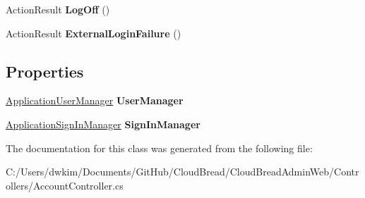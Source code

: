 \begin{DoxyCompactItemize}
\item 
Action\+Result {\bfseries Log\+Off} ()\hypertarget{class_cloud_bread_admin_web_1_1_controllers_1_1_account_controller_a5fd1abcf376de86b70209e770cbb5bca}{}\label{class_cloud_bread_admin_web_1_1_controllers_1_1_account_controller_a5fd1abcf376de86b70209e770cbb5bca}

\item 
Action\+Result {\bfseries External\+Login\+Failure} ()\hypertarget{class_cloud_bread_admin_web_1_1_controllers_1_1_account_controller_a4553fc1091db8e6a23cf05a80beca438}{}\label{class_cloud_bread_admin_web_1_1_controllers_1_1_account_controller_a4553fc1091db8e6a23cf05a80beca438}

\end{DoxyCompactItemize}
\subsection*{Properties}
\begin{DoxyCompactItemize}
\item 
\hyperlink{class_cloud_bread_admin_web_1_1_application_user_manager}{Application\+User\+Manager} {\bfseries User\+Manager}\hypertarget{class_cloud_bread_admin_web_1_1_controllers_1_1_account_controller_a6afd7b8108ddbf88909d4d7d85f22e7d}{}\label{class_cloud_bread_admin_web_1_1_controllers_1_1_account_controller_a6afd7b8108ddbf88909d4d7d85f22e7d}

\item 
\hyperlink{class_cloud_bread_admin_web_1_1_application_sign_in_manager}{Application\+Sign\+In\+Manager} {\bfseries Sign\+In\+Manager}\hypertarget{class_cloud_bread_admin_web_1_1_controllers_1_1_account_controller_af6e2b39dcd4e452ffafac3b7b11dfe13}{}\label{class_cloud_bread_admin_web_1_1_controllers_1_1_account_controller_af6e2b39dcd4e452ffafac3b7b11dfe13}

\end{DoxyCompactItemize}


The documentation for this class was generated from the following file\+:\begin{DoxyCompactItemize}
\item 
C\+:/\+Users/dwkim/\+Documents/\+Git\+Hub/\+Cloud\+Bread/\+Cloud\+Bread\+Admin\+Web/\+Controllers/Account\+Controller.\+cs\end{DoxyCompactItemize}
